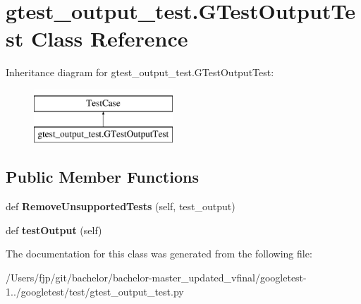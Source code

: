 \hypertarget{classgtest__output__test_1_1_g_test_output_test}{}\section{gtest\+\_\+output\+\_\+test.\+G\+Test\+Output\+Test Class Reference}
\label{classgtest__output__test_1_1_g_test_output_test}
Inheritance diagram for gtest\+\_\+output\+\_\+test.\+G\+Test\+Output\+Test\+:\begin{figure}[H]
\begin{center}
\leavevmode
\includegraphics[height=2.000000cm]{classgtest__output__test_1_1_g_test_output_test}
\end{center}
\end{figure}
\subsection*{Public Member Functions}
\begin{DoxyCompactItemize}
\item 
\mbox{\label{classgtest__output__test_1_1_g_test_output_test_a63f62268f795adfc5ca91514dbec2873}} 
def {\bfseries Remove\+Unsupported\+Tests} (self, test\+\_\+output)
\item 
\mbox{\label{classgtest__output__test_1_1_g_test_output_test_a1e6b96f68c5bcb8271de3208fa7f9f64}} 
def {\bfseries test\+Output} (self)
\end{DoxyCompactItemize}


The documentation for this class was generated from the following file\+:\begin{DoxyCompactItemize}
\item 
/\+Users/fjp/git/bachelor/bachelor-\/master\+\_\+updated\+\_\+vfinal/googletest-\/1../googletest/test/gtest\+\_\+output\+\_\+test.\+py\end{DoxyCompactItemize}
